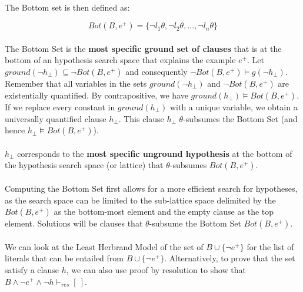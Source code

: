 \documentclass{article}
\theoremstyle{plain}
\theoremstyle{definition}
\begin{document}
\begin{multicols}{2}
\paragraph{} The Bottom set is then defined as:

$$Bot(B, e^+) = \{\lnot l_1\theta, \lnot l_2\theta, ..., \lnot l_n\theta\}$$

\paragraph{} The Bottom Set is the \textbf{most specific ground set of clauses} that is at the bottom of an hypothesis search space that explains the example $e^+$. Let $ground(\lnot h_{\perp}) \subseteq \lnot Bot(B, e^+)$ and consequently $\lnot Bot(B, e^+) \models g(\lnot h_{\perp})$. Remember that all variables in the sets $ground(\lnot h_{\perp})$ and $\lnot Bot(B, e^+)$ are existentially quantified. By contrapositive, we have $ground(h_{\perp}) \models Bot(B, e^+)$. If we replace every constant in $ground(h_{\perp})$ with a unique variable, we obtain a universally quantified clause $h_{\perp}$. This clause $h_{\perp}$ $\theta$-subsumes the Bottom Set (and hence $h_{\perp} \models Bot(B, e^+)$).

\paragraph{} $h_{\perp}$ corresponds to the \textbf{most specific unground hypothesis} at the bottom of the hypothesis search space (or lattice) that $\theta$-subsumes $Bot(B, e^+)$. 

\paragraph{} Computing the Bottom Set first allows for a more efficient search for hypotheses, as the search space can be limited to the sub-lattice space delimited by the $Bot(B, e^+)$ as the bottom-most element and the empty clause as the top element. Solutions will be clauses that $\theta$-subsume the Bottom Set $Bot(B, e^+)$.

\paragraph{} We can look at the Least Herbrand Model of the set of $B \cup \{\lnot e^+\}$ for the list of literals that can be entailed from $B \cup \{\lnot e^+\}$. Alternatively, to prove that the set satisfy a clause $h$, we can also use proof by resolution to show that $B \land \lnot e^+ \land \lnot h \vdash_{res} [\ ]$.


\end{multicols}
\end{document}
